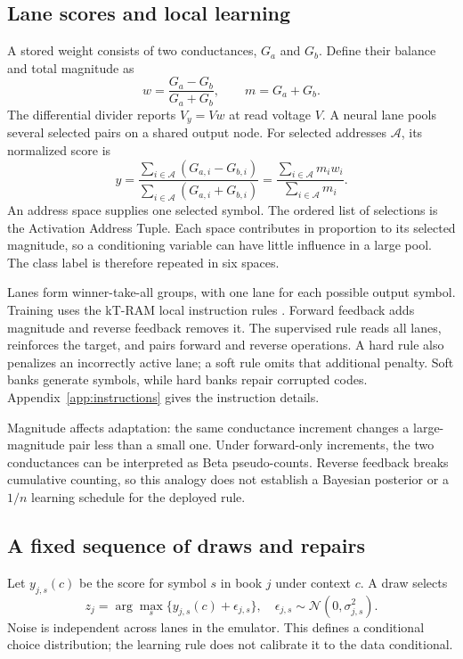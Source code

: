 \documentclass[reprint,amsmath,amssymb,aps,pra,floatfix,nofootinbib]{revtex4-2}
\begin{document}
\subsection{Lane scores and local learning}\label{sec:lanes}
A stored weight consists of two conductances, $G_a$ and $G_b$. Define their balance and total magnitude as
\begin{equation}
w=\frac{G_a-G_b}{G_a+G_b},\qquad m=G_a+G_b.
\end{equation}
The differential divider reports $V_y=Vw$ at read voltage $V$. A neural lane pools several selected pairs on a shared output node. For selected addresses $\mathcal A$, its normalized score is
\begin{equation}
y=\frac{\sum_{i\in\mathcal A}(G_{a,i}-G_{b,i})}
        {\sum_{i\in\mathcal A}(G_{a,i}+G_{b,i})}
 =\frac{\sum_{i\in\mathcal A}m_iw_i}{\sum_{i\in\mathcal A}m_i}.
\label{eq:pool}
\end{equation}
An address space supplies one selected symbol. The ordered list of selections is the Activation Address Tuple. Each space contributes in proportion to its selected magnitude, so a conditioning variable can have little influence in a large pool. The class label is therefore repeated in six spaces.

Lanes form winner-take-all groups, with one lane for each possible output symbol. Training uses the kT-RAM local instruction rules \cite{knowm2026blog,knowm2026emulator}. Forward feedback adds magnitude and reverse feedback removes it. The supervised rule reads all lanes, reinforces the target, and pairs forward and reverse operations. A hard rule also penalizes an incorrectly active lane; a soft rule omits that additional penalty. Soft banks generate symbols, while hard banks repair corrupted codes. Appendix~\ref{app:instructions} gives the instruction details.

Magnitude affects adaptation: the same conductance increment changes a large-magnitude pair less than a small one. Under forward-only increments, the two conductances can be interpreted as Beta pseudo-counts. Reverse feedback breaks cumulative counting, so this analogy does not establish a Bayesian posterior or a $1/n$ learning schedule for the deployed rule.

\subsection{A fixed sequence of draws and repairs}\label{sec:sequence}
Let $y_{j,s}(c)$ be the score for symbol $s$ in book $j$ under context $c$. A draw selects
\begin{equation}
z_j=\arg\max_s\{y_{j,s}(c)+\epsilon_{j,s}\},
\quad \epsilon_{j,s}\sim\mathcal N(0,\sigma_{j,s}^2).
\label{eq:draw}
\end{equation}
Noise is independent across lanes in the emulator. This defines a conditional choice distribution; the learning rule does not calibrate it to the data conditional.
\end{document}
